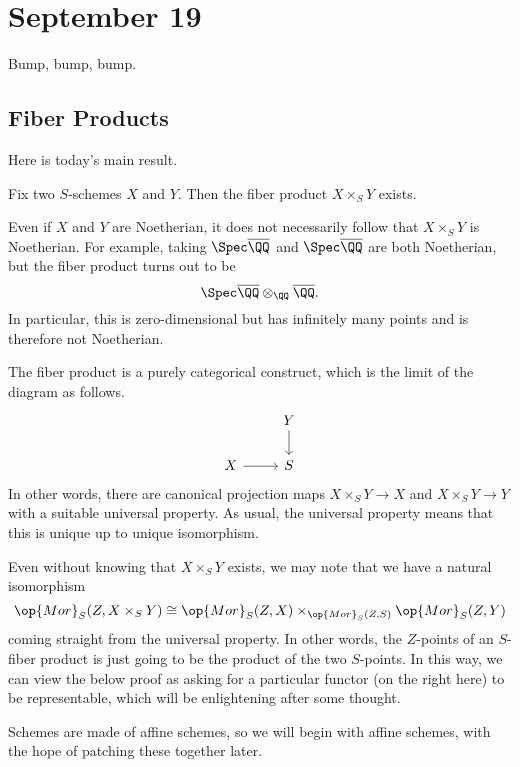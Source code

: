\documentclass[../notes.tex]{subfiles}
\begin{document}
\section{September 19}

Bump, bump, bump.

\subsection{Fiber Products}
Here is today's main result.
\begin{theorem} \label{thm:fibexist}
	Fix two $S$-schemes $X$ and $Y$. Then the fiber product $X\times_SY$ exists.
\end{theorem}
\begin{remark}
	Even if $X$ and $Y$ are Noetherian, it does not necessarily follow that $X\times_SY$ is Noetherian. For example, taking $\Spec\overline\QQ$ and $\Spec\overline\QQ$ are both Noetherian, but the fiber product turns out to be
	\[\Spec\overline\QQ\otimes_\QQ\overline\QQ.\]
	In particular, this is zero-dimensional but has infinitely many points and is therefore not Noetherian.
\end{remark}
The fiber product is a purely categorical construct, which is the limit of the diagram as follows.
\[\begin{tikzcd}
	& Y \\
	X & S
	\arrow[from=2-1, to=2-2]
	\arrow[from=1-2, to=2-2]
\end{tikzcd}\]
In other words, there are canonical projection maps $X\times_SY\to X$ and $X\times_SY\to Y$ with a suitable universal property. As usual, the universal property means that this is unique up to unique isomorphism.
\begin{remark}
	Even without knowing that $X\times_SY$ exists, we may note that we have a natural isomorphism
	\[\op{Mor}_S(Z,X\times_SY)\cong\op{Mor}_S(Z,X)\times_{\op{Mor}_S(Z,S)}\op{Mor}_S(Z,Y)\]
	coming straight from the universal property. In other words, the $Z$-points of an $S$-fiber product is just going to be the product of the two $S$-points. In this way, we can view the below proof as asking for a particular functor (on the right here) to be representable, which will be enlightening after some thought.
\end{remark}
Schemes are made of affine schemes, so we will begin with affine schemes, with the hope of patching these together later.
\end{document}
